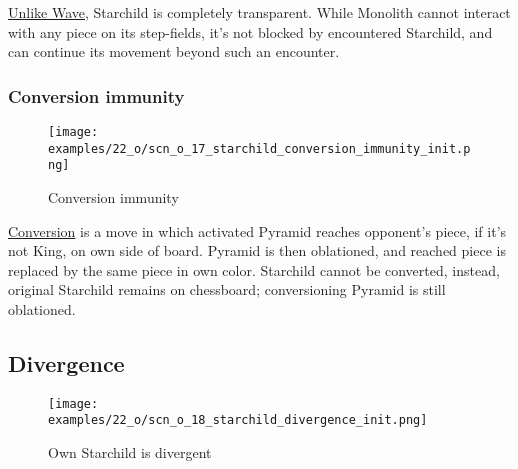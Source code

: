\vspace*{-0.4\baselineskip}
\hyperref[fig:scn_d_02_monolith_first_step]{Unlike Wave}, Starchild is completely
transparent. While Monolith cannot interact with any piece on its step-fields, it's
not blocked by encountered Starchild, and can continue its movement beyond such an
encounter.

\clearpage %

\subsubsection*{Conversion immunity}
\label{sec:One/Starchild/Movement/Conversion immunity}

\vspace*{-1.4\baselineskip}
\noindent
\begin{figure}[!h]
\texttt{[image: examples/22\_o/scn\_o\_17\_starchild\_conversion\_immunity\_init.png]}
\caption{Conversion immunity}
\label{fig:scn_o_17_starchild_conversion_immunity_init}
\end{figure}

\hyperref[sec:Mayan Ascendancy/Pyramid/Conversion]{Conversion} is a move in which
activated Pyramid reaches opponent's piece, if it's not King, on own side of board.
Pyramid is then oblationed, and reached piece is replaced by the same piece in own
color. Starchild cannot be converted, instead, original Starchild remains on
chessboard; conversioning Pyramid is still oblationed.

\clearpage %

\subsection*{Divergence}
\label{sec:One/Starchild/Divergence}

\vspace*{-1.5\baselineskip}
\noindent
\begin{figure}[!h]
\texttt{[image: examples/22\_o/scn\_o\_18\_starchild\_divergence\_init.png]}
\vspace*{-1.4\baselineskip}
\caption{Own Starchild is divergent}
\label{fig:scn_o_18_starchild_divergence_init}
\end{figure}

